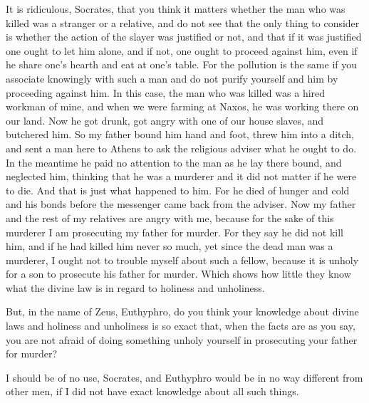 \documentclass[letterpaper,12pt]{article}
\newcommand{\stephpag}[1]{\marginnote{\small\itshape\fontfamily{ppl}\selectfont #1}}
\begin{document}
\begin{drama}
\euthyphrospeaks
It is ridiculous, Socrates, that you think it matters whether the man who was killed was a stranger or a relative, and do not see that the only thing to consider is whether the action of the slayer was justified or not, and that if it was justified one ought to let him alone, and if not, one ought to proceed against him, even if he share one's hearth \stephpag{c} and eat at one's table. For the pollution is the same if you associate knowingly with such a man and do not purify yourself and him by proceeding against him. In this case, the man who was killed was a hired workman of mine, and when we were farming at Naxos, he was working there on our land. Now he got drunk, got angry with one of our house slaves, and butchered him. So my father bound him hand and foot, threw him into a ditch, and sent a man here to Athens to ask the religious adviser what he ought \stephpag{d} to do. In the meantime he paid no attention to the man as he lay there bound, and neglected him, thinking that he was a murderer and it did not matter if he were to die. And that is just what happened to him. For he died of hunger and cold and his bonds before the messenger came back from the adviser. Now my father and the rest of my relatives are angry with me, because for the sake of this murderer I am prosecuting my father for murder. For they say he did not kill him, and if he had killed him never so much, yet since the dead man was a murderer, I ought not to trouble myself about such a fellow, \stephpag{e} because it is unholy for a son to prosecute his father for murder. Which shows how little they know what the divine law is in regard to holiness and unholiness.

\socratesspeaks
But, in the name of Zeus, Euthyphro, do you think your knowledge about divine laws and holiness and unholiness is so exact that, when the facts are as you say, you are not afraid of doing something unholy yourself in prosecuting your father for murder?

\euthyphrospeaks
I should be of no use, Socrates, \stephpag{5 a} and Euthyphro would be in no way different from other men, if I did not have exact knowledge about all such things.


\end{drama}
\end{document}
